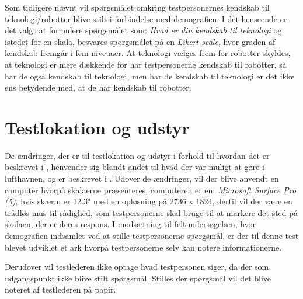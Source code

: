 Som tidligere nævnt vil spørgsmålet omkring testpersonernes kendskab til teknologi/robotter blive stilt i forbindelse med demografien. I det henseende er det valgt at formulere spørgsmålet som: \textit{Hvad er din kendskab til teknologi} og istedet for en skala, besvares spørgsmålet på en \textit{Likert-scale}, hvor graden af kendskab fremgår i fem niveuaer. At teknologi vælges frem for robotter skyldes, at teknologi er mere dækkende for har testpersonerne kendskab til robotter, så har de også kendskab til teknologi, men har de kendskab til teknologi er det ikke ens betydende med, at de har kendskab til robotter.

\section{Testlokation og udstyr}
\label{TestAfSkalaLokationUdstyr}
%
De ændringer, der er til testlokation og udstyr i forhold til hvordan det er beskrevet i , henvender sig blandt andet til hvad der var muligt at gøre i lufthavnen, og er beskrevet i . Udover de ændringer, vil der blive anvendt en computer hvorpå skalaerne præsenteres, computeren er en: \textit{Microsoft Surface Pro (5)}, hvis skærm er 12.3" med en opløsning på 2736 x 1824, dertil vil der være en trådløs mus til rådighed, som testpersonerne skal bruge til at markere det sted på skalaen, der er deres respons. I modsætning til feltundersøgelsen, hvor demografien indsamlet ved at stille testpersonerne spørgsmål, er der til denne test blevet udviklet et ark hvorpå testpersonerne selv kan notere informationerne. 

Derudover vil testlederen ikke optage hvad testpersonen siger, da der som udgangspunkt ikke blive stilt spørgsmål. Stilles der spørgsmål vil det blive noteret af testlederen på papir. 


